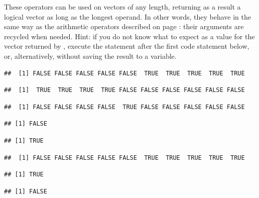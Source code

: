 \documentclass[krantz2]{krantz}\usepackage{knitr}
\begin{document}
These operators can be used on vectors of any length, returning as a result a logical vector as long as the longest operand. In other words, they behave in the same way as the arithmetic operators described on page \pageref{par:vectorized:numeric}: their arguments are recycled when needed. Hint: if you do not know what to expect as a value for the vector returned by , execute the statement  after the first code statement below, or, alternatively,  without saving the result to a variable.

\begin{knitrout}\footnotesize
{}\color{fgcolor}\begin{kframe}
\begin{alltt}
 \hlkwb{<-} \hlopt{:}
 \hlopt{>} 
\end{alltt}
\begin{verbatim}
##  [1] FALSE FALSE FALSE FALSE FALSE  TRUE  TRUE  TRUE  TRUE  TRUE
\end{verbatim}
\begin{alltt}
 \hlopt{<} 
\end{alltt}
\begin{verbatim}
##  [1]  TRUE  TRUE  TRUE  TRUE FALSE FALSE FALSE FALSE FALSE FALSE
\end{verbatim}
\begin{alltt}
 \hlopt{==} 
\end{alltt}
\begin{verbatim}
##  [1] FALSE FALSE FALSE FALSE  TRUE FALSE FALSE FALSE FALSE FALSE
\end{verbatim}
\begin{alltt}
 \hlopt{>} \hlstd{)}
\end{alltt}
\begin{verbatim}
## [1] FALSE
\end{verbatim}
\begin{alltt}
 \hlopt{>} \hlstd{)}
\end{alltt}
\begin{verbatim}
## [1] TRUE
\end{verbatim}
\begin{alltt}
 \hlkwb{<-}  \hlopt{>} 
\end{alltt}
\begin{verbatim}
##  [1] FALSE FALSE FALSE FALSE FALSE  TRUE  TRUE  TRUE  TRUE  TRUE
\end{verbatim}
\begin{alltt}
\end{alltt}
\begin{verbatim}
## [1] TRUE
\end{verbatim}
\begin{alltt}
\end{alltt}
\begin{verbatim}
## [1] FALSE
\end{verbatim}
\end{kframe}
\end{knitrout}
\end{document}
